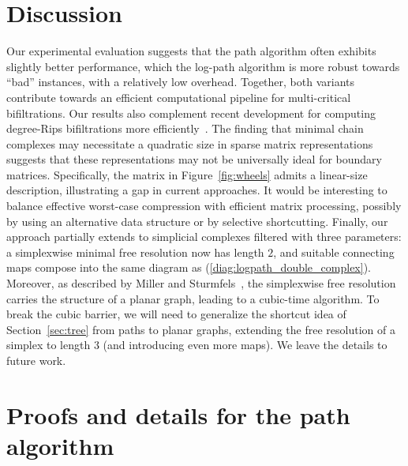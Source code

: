 \documentclass[11pt]{article}
\begin{document}
\section{Discussion} 
\label{sec:conclusion}
%
Our experimental evaluation suggests that the path algorithm often exhibits slightly
better performance, which the log-path algorithm is more robust towards
``bad'' instances, with a relatively low overhead.
Together, both
variants contribute towards an efficient
computational pipeline for multi-critical bifiltrations.
Our results also complement recent development for computing degree-Rips
bifiltrations more efficiently~\cite{deg-rips-submission}.
The finding that minimal chain complexes may necessitate a quadratic size in sparse matrix representations suggests that these representations may not be universally ideal for boundary matrices.
Specifically, the matrix in Figure~\ref{fig:wheels} admits a linear-size description, illustrating a gap in current approaches.
It would be interesting to balance effective worst-case compression with efficient matrix processing, possibly by using an alternative data structure or by selective shortcutting.
%
Finally, our approach partially extends to simplicial complexes
filtered with three parameters: a simplexwise minimal free resolution now has length
$2$, and suitable connecting maps compose into the same diagram as 
(\ref{diag:logpath_double_complex}).
Moreover, as described by
Miller and Sturmfels~\cite{miller_sturmfels_book}, the simplexwise
free resolution carries the structure of a planar graph,
leading to a cubic-time algorithm. 
To break the cubic barrier, we will need to generalize the shortcut idea
of Section~\ref{sec:tree}
from paths to planar graphs, extending the free resolution of a simplex
to length $3$ (and introducing even more maps). We leave the details to future work.
%
\newpage
%
%
%
%
%
\newpage
%
%
\appendix
%
\section{Proofs and details for the path algorithm}
\label{app:path}
%
\end{document}
